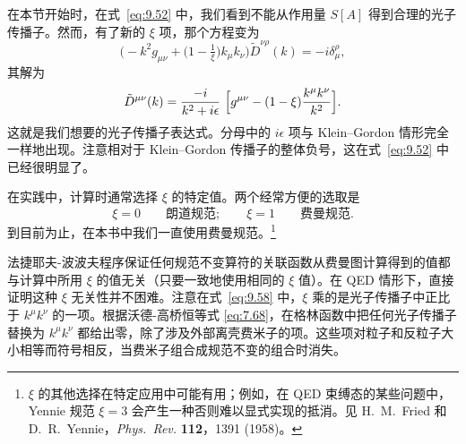 在本节开始时，在式~\eqref{eq:9.52} 中，我们看到不能从作用量 $S[A]$ 得到合理的光子传播子。然而，有了新的 $\xi$ 项，那个方程变为
\begin{equation}
  \bigl( -k^2 g_{\mu\nu} + \bigl( 1 - \tfrac{1}{\xi} \bigr)k_\mu k_\nu \bigr)
    \tilde{D}^{\nu\rho}(k) = -i\delta^\rho_\mu ,
\end{equation}
其解为
\begin{equation}
  \tilde{D}^{\mu\nu}(k) = \frac{-i}{k^2+i\epsilon}\ \Bigl[
    g^{\mu\nu} - (1-\xi)\frac{k^\mu k^\nu}{k^2} \Bigr] .
  \label{eq:9.58}
\end{equation}
这就是我们想要的光子传播子表达式。分母中的 $i\epsilon$ 项与 Klein--Gordon 情形完全一样地出现。注意相对于 Klein--Gordon 传播子的整体负号，这在式~\eqref{eq:9.52} 中已经很明显了。

在实践中，计算时通常选择 $\xi$ 的特定值。两个经常方便的选取是
\begin{equation}
  \xi = 0 \qquad \text{朗道规范};\qquad
  \xi = 1 \qquad \text{费曼规范} .
\end{equation}
到目前为止，在本书中我们一直使用费曼规范。\footnote{$\xi$ 的其他选择在特定应用中可能有用；例如，在 QED 束缚态的某些问题中，Yennie 规范 $\xi = 3$ 会产生一种否则难以显式实现的抵消。见 H.~M.~Fried 和 D.~R.~Yennie，\emph{Phys.\ Rev.} \textbf{112}，1391 (1958)。}

法捷耶夫-波波夫程序保证任何规范不变算符的关联函数从费曼图计算得到的值都与计算中所用 $\xi$ 的值无关（只要一致地使用相同的 $\xi$ 值）。在 QED 情形下，直接证明这种 $\xi$ 无关性并不困难。注意在式~\eqref{eq:9.58} 中，$\xi$ 乘的是光子传播子中正比于 $k^\mu k^\nu$ 的一项。根据沃德-高桥恒等式 \eqref{eq:7.68}，在格林函数中把任何光子传播子替换为 $k^\mu k^\nu$ 都给出零，除了涉及外部离壳费米子的项。这些项对粒子和反粒子大小相等而符号相反，当费米子组合成规范不变的组合时消失。

